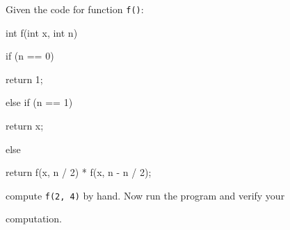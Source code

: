Given the code for function \texttt{f()}:



\begin{consolethree}[escapeinside=||]

int f(int x, int n)

{

    if (n == 0)

    {

        return 1;

    }

    else if (n == 1)

    {

        return x;

    }

    else

    {

        return f(x, n / 2) * f(x, n - n / 2);

    }

}

\end{consolethree}



compute \texttt{f(2, 4)} by hand. Now run the program and verify your

computation.

